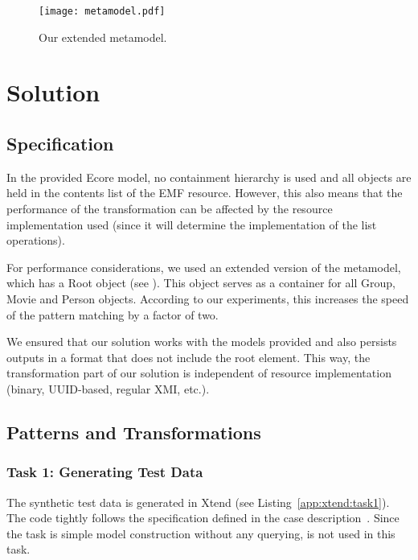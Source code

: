 \begin{figure}
	\centering
	\texttt{[image: metamodel.pdf]}
	\caption{Our extended metamodel.}\label{fig:metamodel}
\end{figure}

\section{Solution}
\label{sec:solution}

\subsection{Specification}

In the provided Ecore model, no containment hierarchy is used and all objects are held in the \textsf{contents} list of the EMF resource. However, this also means that the performance of the transformation can be affected by the resource implementation used (since it will determine the implementation of the list operations).

For performance considerations, we used an extended version of the metamodel, which has a \textsf{Root} object (see ). This object serves as a container for all \textsf{Group}, \textsf{Movie} and \textsf{Person} objects. According to our experiments, this increases the speed of the pattern matching by a factor of two.

We ensured that our solution works with the models provided and also persists outputs in a format that does not include the root element. This way, the transformation part of our solution is independent of resource implementation (binary, UUID-based, regular XMI, etc.).

\subsection{Patterns and Transformations}

\subsubsection{Task 1: Generating Test Data}
\label{t1}

The synthetic test data is generated in Xtend (see Listing~\ref{app:xtend:task1}). The code tightly follows the specification defined in the case description~\cite{Horn14}.
Since the task is simple model construction without any querying, \incquery{} is not used in this task. 

